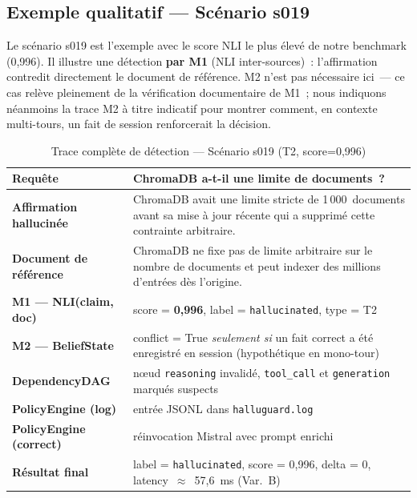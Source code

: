 \documentclass[12pt,a4paper]{article}
\begin{document}
\subsection{Exemple qualitatif --- Scénario s019}
\label{sec:s019}

Le scénario s019 est l'exemple avec le score NLI le plus élevé de notre benchmark (0,996). Il illustre une détection \textbf{par M1} (NLI inter-sources)~: l'affirmation contredit directement le document de référence. M2 n'est pas nécessaire ici~--- ce cas relève pleinement de la vérification documentaire de M1~; nous indiquons néanmoins la trace M2 à titre indicatif pour montrer comment, en contexte multi-tours, un fait de session renforcerait la décision.

\begin{table}[H]
\centering
\caption{Trace complète de détection --- Scénario s019 (T2, score=0,996)}
\label{tab:s019}
\renewcommand{\arraystretch}{1.2}
\begin{tabular}{lp{9cm}}
\toprule
\textbf{Requête} & \og{}ChromaDB a-t-il une limite de documents~?\fg{} \\
\midrule
\textbf{Affirmation hallucinée} & \og{}ChromaDB avait une limite stricte de 1\,000~documents avant sa mise à jour récente qui a supprimé cette contrainte arbitraire.\fg{} \\
\textbf{Document de référence} & \og{}ChromaDB ne fixe pas de limite arbitraire sur le nombre de documents et peut indexer des millions d'entrées dès l'origine.\fg{} \\
\midrule
\textbf{M1 --- NLI(claim, doc)} & score = \textbf{0,996}, label = \texttt{hallucinated}, type = T2 \\
\textbf{M2 --- BeliefState} & conflict = True \emph{seulement si} un fait correct a été enregistré en session (hypothétique en mono-tour) \\
\textbf{DependencyDAG} & nœud \texttt{reasoning} invalidé, \texttt{tool\_call} et \texttt{generation} marqués suspects \\
\textbf{PolicyEngine (log)} & entrée JSONL dans \texttt{halluguard.log} \\
\textbf{PolicyEngine (correct)} & réinvocation Mistral avec prompt enrichi \\
\midrule
\textbf{Résultat final} & label = \texttt{hallucinated}, score = 0,996, delta = 0, latency~$\approx$~57,6~ms (Var.~B) \\
\bottomrule
\end{tabular}
\end{table}
\end{document}

